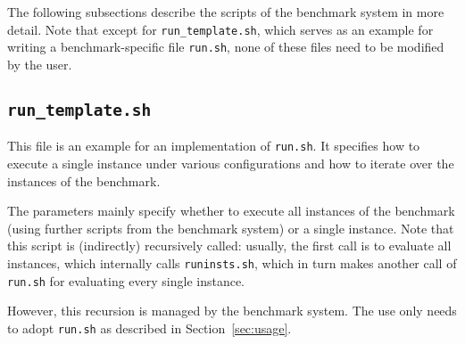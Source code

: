 \documentclass[a4paper]{article}
\begin{document}
		The following subsections describe the scripts of the benchmark system
		in more detail.
		Note that except for {\tt run\_template.sh}, which serves as an example
		for writing a benchmark-specific file {\tt run.sh}, none of these files need
		to be modified by the user.

		\subsection{\tt run\_template.sh}
		\label{sec:architecture:run}
		
			This file is an example for an implementation of {\tt run.sh}.
		    It specifies how to execute a single instance under various configurations
		    and how to iterate over the instances of the benchmark.
		    
		    The parameters mainly specify whether to execute all instances
		    of the benchmark (using further scripts from the benchmark system)
		    or a single instance.
		    Note that this script is (indirectly) recursively called:
		    usually, the first call is to evaluate all instances, which internally
		    calls {\tt runinsts.sh}, which in turn makes another call of {\tt run.sh}
		    for evaluating every single instance.
		
		    However, this recursion is managed by the benchmark system.
		    The use only needs to adopt {\tt run.sh} as described in Section~\ref{sec:usage}.
		
\end{document}
